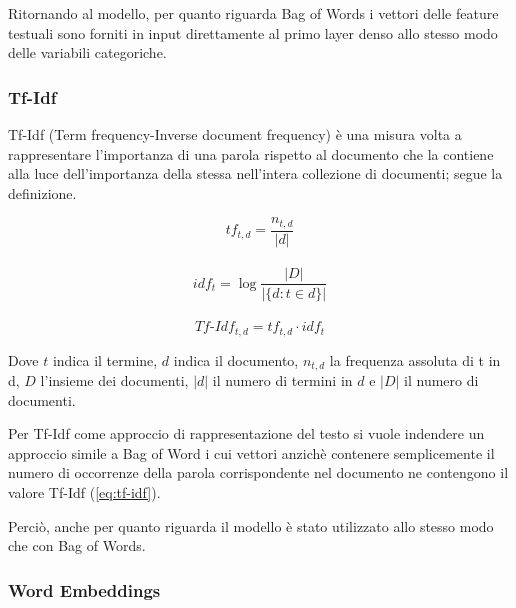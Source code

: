 Ritornando al modello, per quanto riguarda Bag of Words i vettori delle feature
testuali sono forniti in input direttamente al primo layer denso allo stesso
modo delle variabili categoriche.

\subsubsection{Tf-Idf}\label{section-tfidf} Tf-Idf (Term frequency-Inverse
document frequency) \cite{manning_raghavan_schutze_2008} è una misura volta a
rappresentare l'importanza di una parola rispetto al documento che la contiene alla luce
dell'importanza della stessa nell'intera collezione di documenti; segue la
definizione.%

\begin{equation}
\label{eq:tf}
   tf_{t,d} = \frac{n_{t,d}}{|d|} 
\end{equation}
\\
\begin{equation}
\label{eq:idf}
   idf_{t} = \log \frac{|D|}{|\{d: t \in d\}|} 
\end{equation}
\\
\begin{equation}
\label{eq:tf-idf}
    Tf\mbox{-}Idf_{t,d} = tf_{t,d} \cdot idf_t
\end{equation}

Dove $t$ indica il termine, $d$
indica il documento, $n_{t,d}$ la frequenza assoluta di t in d, $D$ l'insieme
dei documenti, $|d|$ il numero di termini in $d$ e $|D|$ il numero di documenti.

Per Tf-Idf come approccio di rappresentazione del testo si vuole indendere un
approccio simile a Bag of Word i cui vettori anzichè contenere semplicemente il numero di
occorrenze della parola corrispondente nel documento ne contengono il valore
Tf-Idf (\ref{eq:tf-idf}).

Perciò, anche per quanto riguarda il modello è stato utilizzato allo stesso modo
che con Bag of Words. 



\subsubsection{Word Embeddings}

